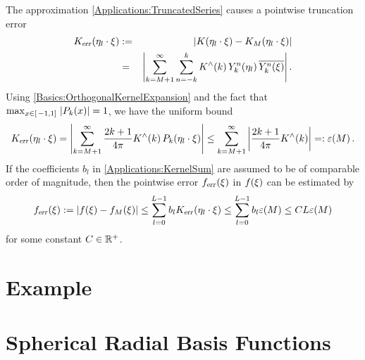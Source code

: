 \documentclass[11pt,a4paper,twoside,bibtotoc]{scrartcl}
\theoremstyle{plain}
\theoremstyle{definition}
\newtheorem{example}[theorem]{Example}
\theoremstyle{remark}
\numberwithin{equation}{section}
\numberwithin{table}{section}
\numberwithin{figure}{section}
\begin{document}
The approximation \eqref{Applications:TruncatedSeries} causes a pointwise truncation error 
\begin{eqnarray*}
  K_{\text{\textsl{err}}}{\hspace{-0.4ex}}\left(\mathbf{\eta}_{l} \cdot \mathbf{\xi}\right) 
    & := & \left\vert K{\hspace{-0.4ex}}\left(\mathbf{\eta}_{l} \cdot \mathbf{\xi}\right) - K_{M}{\hspace{-0.4ex}}\left(\mathbf{\eta}_{l} \cdot \mathbf{\xi}\right)\right\vert\\
    &  = & \left\vert\sum_{k=M+1}^{\infty} \sum_{n=-k}^k K^{\wedge}{\hspace{-0.4ex}}\left(k\right) Y_{k}^n{\hspace{-0.4ex}}\left(\mathbf{\eta}_{l}\right) \overline{Y_{k}^n{\hspace{-0.4ex}}\left(\mathbf{\xi}\right)}\right\vert.
\end{eqnarray*}
Using \eqref{Basics:OrthogonalKernelExpansion} and the fact that $\max_{x \in \left[\left.-1,1\right]\right.} \left\vert P_{k}{\hspace{-0.4ex}}\left(x\right)\right\vert = 1$, we have the uniform bound
\[
  K_{\text{\textsl{err}}}{\hspace{-0.4ex}}\left(\mathbf{\eta}_{l} \cdot \mathbf{\xi}\right) 
  = \left\vert\sum_{k = M+1}^{\infty} \frac{2k+1}{4\pi} K^{\wedge}{\hspace{-0.4ex}}\left(k\right) P_k{\hspace{-0.4ex}}\left(\mathbf{\eta}_{l} \cdot \mathbf{\xi}\right)\right\vert 
  \le \sum_{k = M+1}^{\infty} \left\vert\frac{2k+1}{4\pi} K^{\wedge}{\hspace{-0.4ex}}\left(k\right)\right\vert =: \varepsilon{\hspace{-0.4ex}}\left(M\right).
\]
If the coefficients $b_{l}$ in \eqref{Applications:KernelSum} are assumed to be of comparable order of magnitude, then the pointwise error $f_{\text{\textsl{err}}}{\hspace{-0.4ex}}\left(\xi\right)$ in $f{\hspace{-0.4ex}}\left(\mathbf{\xi}\right)$ can be estimated by
\[
  f_{\text{\textsl{err}}}{\hspace{-0.4ex}}\left(\xi\right) := \left\vert f{\hspace{-0.4ex}}\left(\xi\right) - f_{M}{\hspace{-0.4ex}}\left(\xi\right)\right\vert 
  \le \sum_{l=0}^{L-1} b_{l} K_{\text{\textsl{err}}}{\hspace{-0.4ex}}\left(\mathbf{\eta}_{l} \cdot \mathbf{\xi}\right)
  \le \sum_{l=0}^{L-1} b_{l} \varepsilon{\hspace{-0.4ex}}\left(M\right)
  \le C L \varepsilon{\hspace{-0.4ex}}\left(M\right)
\]
for some constant $C \in \mathbb{R}^{+}$.

\section{Example}
\section{Spherical Radial Basis Functions}
\label{Basics:SphericalKernels}
\end{document}

